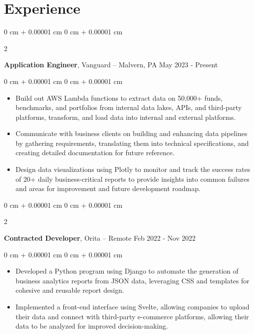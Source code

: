 \documentclass[10pt, letterpaper]{article}
\newenvironment{highlights}{
    \begin{itemize}[
        topsep=0.10 cm,
        parsep=0.10 cm,
        partopsep=0pt,
        itemsep=0pt,
        leftmargin=0 cm + 10pt
    ]
}{
    \end{itemize}
} %
\newenvironment{onecolentry}{
    \begin{adjustwidth}{
        0 cm + 0.00001 cm
    }{
        0 cm + 0.00001 cm
    }
}{
    \end{adjustwidth}
} %
\newenvironment{twocolentry}[2][]{
    \onecolentry
    \def\secondColumn{#2}
    \setcolumnwidth{\fill, 4.5 cm}
    \begin{paracol}{2}
}{
    \switchcolumn \raggedleft \secondColumn
    \end{paracol}
    \endonecolentry
} %
\begin{document}
    \section{Experience}
    \begin{twocolentry}{
        May 2023 - Present
    }
    \textbf{Application Engineer}, Vanguard -- Malvern, PA \end{twocolentry}
    \vspace{0.10 cm}
    \begin{onecolentry}
      \begin{highlights}
        \item Build out AWS Lambda functions to extract data on 50,000+ funds, benchmarks, and portfolios from internal data lakes, APIs, and third-party platforms, transform, and load data into internal and external platforms.
        \item Communicate with business clients on building and enhancing data pipelines by gathering requirements, translating them into technical specifications, and creating detailed documentation for future reference.
        \item Design data visualizations using Plotly to monitor and track the success rates of 20+ daily business-critical reports to provide insights into common failures and areas for improvement and future development roadmap.
      \end{highlights}
    \end{onecolentry}
    \vspace{0.2 cm}
    \begin{twocolentry}{
        Feb 2022 - Nov 2022
    }
    \textbf{Contracted Developer}, Orita -- Remote \end{twocolentry}
    \vspace{0.10 cm}
    \begin{onecolentry}
      \begin{highlights}
        \item Developed a Python program using Django to automate the generation of business analytics reports from JSON data, leveraging CSS and templates for cohesive and reusable report design.
        \item Implemented a front-end interface using Svelte, allowing companies to upload their data and connect with third-party e-commerce platforms, allowing their data to be analyzed for improved decision-making.
      \end{highlights}
    \end{onecolentry}
    \vspace{0.2 cm}
\end{document}
